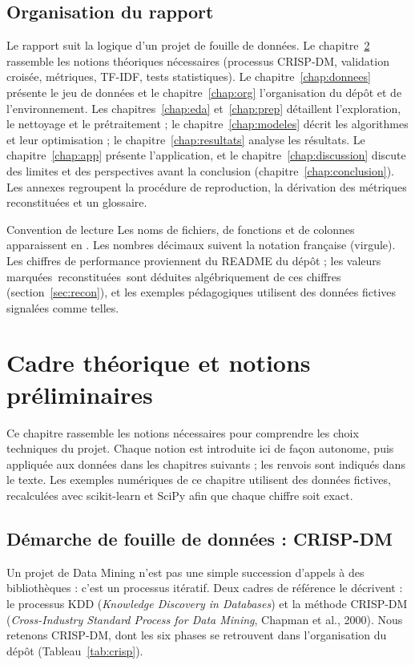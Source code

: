 \documentclass[11pt,a4paper]{report}
\makeatletter
\def\og{\guillemotleft\nobreak\,}%
\def\fg{\unskip\nobreak\,\guillemotright}%
\newcommand{\gl}[1]{\og #1\fg{}}       %
\numberwithin{equation}{chapter}
\DeclareRobustCommand{\code}[1]{{\ttfamily\fontsize{\strip@pt\dimexpr\f@size pt*9/10\relax}{\f@baselineskip}\selectfont\detokenize{#1}}}
\makeatother
\begin{document}
\section{Organisation du rapport}
Le rapport suit la logique d'un projet de fouille de données. Le chapitre~\ref{chap:theorie} rassemble les notions théoriques nécessaires (processus CRISP-DM, validation croisée, métriques, TF-IDF, tests statistiques). Le chapitre~\ref{chap:donnees} présente le jeu de données et le chapitre~\ref{chap:org} l'organisation du dépôt et de l'environnement. Les chapitres~\ref{chap:eda} et~\ref{chap:prep} détaillent l'exploration, le nettoyage et le prétraitement ; le chapitre~\ref{chap:modeles} décrit les algorithmes et leur optimisation ; le chapitre~\ref{chap:resultats} analyse les résultats. Le chapitre~\ref{chap:app} présente l'application, et le chapitre~\ref{chap:discussion} discute des limites et des perspectives avant la conclusion (chapitre~\ref{chap:conclusion}). Les annexes regroupent la procédure de reproduction, la dérivation des métriques reconstituées et un glossaire.

\begin{calloutnote}{Convention de lecture}
Les noms de fichiers, de fonctions et de colonnes apparaissent en \code{police à chasse fixe}. Les nombres décimaux suivent la notation française (virgule). Les chiffres de performance proviennent du README du dépôt ; les valeurs marquées \gl{reconstituées} sont déduites algébriquement de ces chiffres (section~\ref{sec:recon}), et les exemples pédagogiques utilisent des données fictives signalées comme telles.
\end{calloutnote}
\chapter{Cadre théorique et notions préliminaires}\label{chap:theorie}
Ce chapitre rassemble les notions nécessaires pour comprendre les choix techniques du projet. Chaque notion est introduite ici de façon autonome, puis appliquée aux données dans les chapitres suivants ; les renvois sont indiqués dans le texte. Les exemples numériques de ce chapitre utilisent des données fictives, recalculées avec scikit-learn et SciPy afin que chaque chiffre soit exact.

\section{Démarche de fouille de données : CRISP-DM}\label{sec:crispdm}
Un projet de Data Mining n'est pas une simple succession d'appels à des bibliothèques : c'est un processus itératif. Deux cadres de référence le décrivent : le processus KDD (\textit{Knowledge Discovery in Databases}) et la méthode CRISP-DM (\textit{Cross-Industry Standard Process for Data Mining}, Chapman et al., 2000). Nous retenons CRISP-DM, dont les six phases se retrouvent dans l'organisation du dépôt (Tableau~\ref{tab:crisp}).
\end{document}
